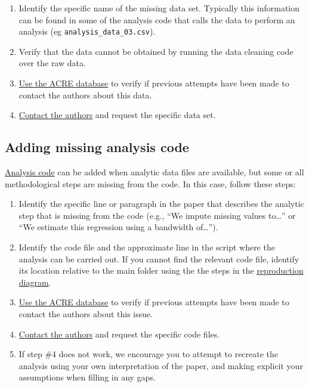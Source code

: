\documentclass[]{book}
\providecommand{\tightlist}{%
  \setlength{\itemsep}{0pt}\setlength{\parskip}{0pt}}
\begin{document}
\begin{enumerate}
\def\labelenumi{\arabic{enumi}.}
\tightlist
\item
  Identify the specific name of the missing data set. Typically this information can be found in some of the analysis code that calls the data to perform an analysis (eg \texttt{analysis\_data\_03.csv}).\\
\item
  Verify that the data cannot be obtained by running the data cleaning code over the raw data.\\
\item
  \href{ADD\%20LINK}{Use the ACRE database} to verify if previous attempts have been made to contact the authors about this data.\\
\item
  \protect\hyperlink{tips-for-communication}{Contact the authors} and request the specific data set.
\end{enumerate}

\hypertarget{ac}{%
\subsection{Adding missing analysis code}\label{ac}}

\protect\hyperlink{describe-inputs}{Analysis code} can be added when analytic data files are available, but some or all methodological steps are missing from the code. In this case, follow these steps:

\begin{enumerate}
\def\labelenumi{\arabic{enumi}.}
\item
  Identify the specific line or paragraph in the paper that describes the analytic step that is missing from the code (e.g., ``We impute missing values to\ldots{}'' or ``We estimate this regression using a bandwidth of\ldots{}'').
\item
  Identify the code file and the approximate line in the script where the analysis can be carried out. If you cannot find the relevant code file, identify its location relative to the main folder using the the steps in the \protect\hyperlink{diagram}{reproduction diagram}.
\item
  \href{ADD\%20LINK}{Use the ACRE database} to verify if previous attempts have been made to contact the authors about this issue.
\item
  \protect\hyperlink{tips-for-communication}{Contact the authors} and request the specific code files.
\item
  If step \#4 does not work, we encourage you to attempt to recreate the analysis using your own interpretation of the paper, and making explicit your assumptions when filling in any gaps.
\end{enumerate}
\end{document}
